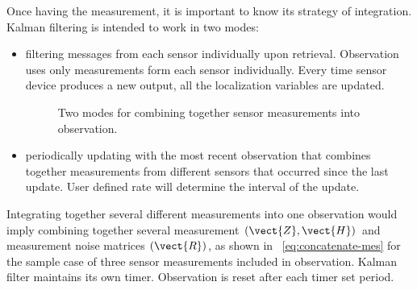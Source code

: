 Once having the measurement, it is important to know its strategy of integration. Kalman filtering is intended to work in two modes:
\begin{itemize}
\item {}
filtering messages from each sensor individually upon retrieval. Observation uses only measurements form each sensor individually. Every time sensor device produces a new output, all the localization variables are updated.
\begin{figure}%
  \begin{center}
  \end{center}
  \caption{Two modes for combining together sensor measurements into observation.}
  \vspace{-10pt}
  \label{fig:ekf-modes}
\end{figure}
\item {}
periodically updating with the most recent observation that combines together measurements from different sensors that occurred since the last update. User defined rate will determine the interval of the update.
\end{itemize}
Integrating together several different measurements into one observation would imply combining together several measurement $(\vect{Z}, \vect{H})$ and measurement noise matrices $(\vect{R})$, as shown in ~\ref{eq:concatenate-mes} for the sample case of three sensor measurements included in observation. Kalman filter maintains its own timer. Observation is reset after each timer set period.  
